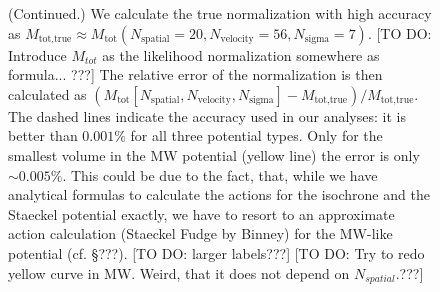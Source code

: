 \addtocounter{figure}{-1}
\begin{figure} [t!]
  \caption{(Continued.) We calculate the true normalization with high accuracy as $M_\text{tot,true} \approx M_\text{tot}(N_\text{spatial}=20,N_\text{velocity}=56,N_\text{sigma}=7)$. [TO DO: Introduce $M_{tot}$ as the likelihood normalization somewhere as formula... ???] The relative error of the normalization is then calculated as $(M_\text{tot}[N_\text{spatial},N_\text{velocity},N_\text{sigma}] -  M_\text{tot,true} ) / M_\text{tot,true} $. The dashed lines indicate the accuracy used in our analyses: it is better than $0.001\%$ for all three potential types. Only for the smallest volume in the MW potential (yellow line) the error is only $\sim 0.005\%$. This could be due to the fact, that, while we have analytical formulas to calculate the actions for the isochrone and the Staeckel potential exactly, we have to resort to an approximate action calculation (Staeckel Fudge by Binney) for the MW-like potential (cf. \S ???). [TO DO: larger labels???] [TO DO: Try to redo yellow curve in MW. Weird, that it does not depend on $N_{spatial}$.???]}
\end{figure}

